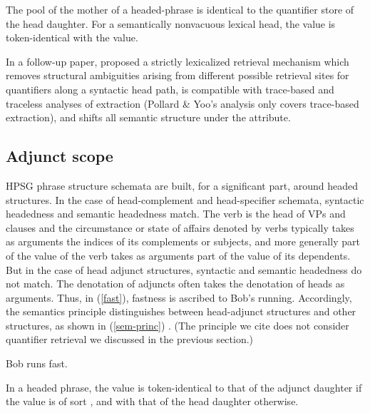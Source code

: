 \documentclass[output=paper]{langsci/langscibook}
\begin{document}
\begin{exe}
\ex\label{cons-PY}
\begin{xlist}
\ex The pool of the mother of a headed-phrase is identical to the quantifier store of the head daughter. 
\ex For a semantically nonvacuous lexical head, the  value is token-identical with the  value.
\end{xlist}
\end{exe}

In a follow-up paper, \citet{Przepiorkowski.1998} proposed a strictly lexicalized retrieval mechanism which removes structural ambiguities arising from different possible retrieval sites for quantifiers along a syntactic head path, is compatible with trace-based and traceless analyses of extraction (Pollard \& Yoo's analysis only covers trace-based extraction), and shifts all semantic structure under the  attribute.


\subsection{Adjunct scope}

HPSG phrase structure schemata are  built, for a significant part, around headed structures. In the case of head-complement and head-specifier schemata, syntactic headedness and semantic headedness match. The verb is the head of VPs and clauses and the circumstance or state of affairs denoted by verbs typically takes as arguments the indices of its complements or subjects, and more generally part of the  value of the verb takes as arguments part of the  value of its dependents. But in the case of head adjunct structures, syntactic and semantic headedness do not match. The denotation of adjuncts often takes the denotation of heads as arguments. Thus, in (\ref{fast}), fastness is ascribed to Bob's running. Accordingly, the semantics principle distinguishes between head-adjunct structures and other structures, as shown in (\ref{sem-princ}) \citep[p.56]{ps2}. (The principle we cite does not consider quantifier retrieval we discussed in the previous section.)

\begin{exe}
\ex\label{fast} Bob runs fast.
\end{exe} 

\begin{exe}
\ex\label{sem-princ}
In a headed phrase, the  value is token-identical to that of the adjunct daughter if the  value is of sort , and with that of the head daughter otherwise.
\end{exe}
\end{document}
